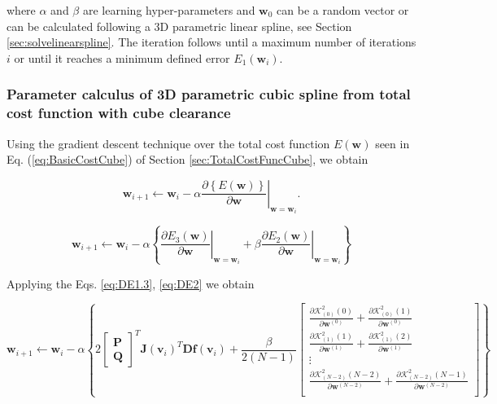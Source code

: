 where $\alpha$ and $\beta$ are learning hyper-parameters and 
$\mathbf{w}_{0}$ can be a random vector or can
be calculated following a 3D parametric linear spline,
see Section \ref{sec:solvelinearspline}.
The iteration follows until a maximum number of iterations $i$ or until it reaches a
minimum defined error $E_1(\mathbf{w}_{i})$. 

\subsubsection{Parameter calculus of 3D parametric cubic spline from total cost function with cube clearance}
Using the gradient descent technique over the total cost function $E(\mathbf{w})$ seen in Eq. (\ref{eq:BasicCostCube}) of Section \ref{sec:TotalCostFuncCube}, we obtain

\begin{equation}
\mathbf{w}_{i+1}
\leftarrow 
\mathbf{w}_{i}
-
\alpha
\left.
\frac{\partial 
\left\{
E(\mathbf{w})
\right\}
}{\partial \mathbf{w}}
\right|_{\mathbf{w}=\mathbf{w}_{i}}.
\end{equation}

\begin{equation}
\mathbf{w}_{i+1}
\leftarrow 
\mathbf{w}_{i}
-
\alpha
\left\{
\left.
\frac{\partial E_{3}(\mathbf{w})}{\partial \mathbf{w}}
\right|_{\mathbf{w}=\mathbf{w}_{i}}
+
\beta
\left.
\frac{\partial E_{2}(\mathbf{w})}{\partial \mathbf{w}}
\right|_{\mathbf{w}=\mathbf{w}_{i}}
\right\}
\end{equation}


Applying the Eqs. \ref{eq:DE1.3}, \ref{eq:DE2} we obtain

\begin{equation}
\mathbf{w}_{i+1}
\leftarrow 
\mathbf{w}_{i}
-
\alpha
\left\{
2
\begin{bmatrix}
\mathbf{P}\\
\mathbf{Q}
\end{bmatrix}^{T}
\mathbf{J}
\left(
\mathbf{v}_{i}
\right)^{T}
\mathbf{D}
\mathbf{f}
\left(
\mathbf{v}_{i}
\right)
+
\frac{\beta}{2(N-1)}
\begin{bmatrix}
%
\frac{
\partial 
\mathcal{K}_{(0)}^{2}(0)
}{\partial \mathbf{w}^{(0)}}
+
\frac{
\partial 
\mathcal{K}_{(0)}^{2}(1)
}{\partial \mathbf{w}^{(0)}}\\[4pt]
%
\frac{
\partial 
\mathcal{K}_{(1)}^{2}(1)
}{\partial \mathbf{w}^{(1)}}
+
\frac{
\partial 
\mathcal{K}_{(1)}^{2}(2)
}{\partial \mathbf{w}^{(1)}}\\[4pt]
%
\vdots\\[4pt]
\frac{
\partial 
\mathcal{K}_{(N-2)}^{2}(N-2)
}{\partial \mathbf{w}^{(N-2)}}
+
\frac{
\partial 
\mathcal{K}_{(N-2)}^{2}(N-1)
}{\partial \mathbf{w}^{(N-2)}}\\
%
\end{bmatrix}
\right\}
\end{equation}

